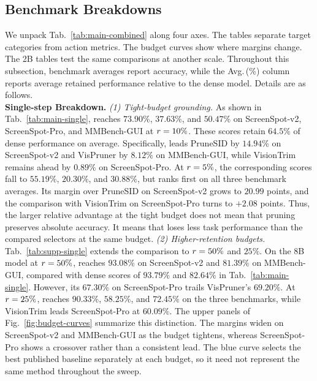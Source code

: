 \subsection{Benchmark Breakdowns}
\label{app:supp-results}
\label{app:full}
We unpack Tab.~\ref{tab:main-combined} along four axes. The tables separate target categories from action metrics. The budget curves show where margins change. The 2B tables test the same comparisons at another scale.
%
Throughout this subsection, benchmark averages report accuracy, while the Avg.\,(\%) column reports average retained performance relative to the dense model.
%
Details are as follows.
\\
\noindent\textbf{Single-step Breakdown.}
\noindent\textit{(1) Tight-budget grounding.}
As shown in Tab.~\ref{tab:main-single}, \method{} reaches $73.90\%$, $37.63\%$, and $50.47\%$ on ScreenSpot-v2, ScreenSpot-Pro, and MMBench-GUI at $r=10\%$.
%
These scores retain $64.5\%$ of dense performance on average.
%
Specifically, \method{} leads PruneSID by $14.94\%$ on ScreenSpot-v2 and VisPruner by $8.12\%$ on MMBench-GUI, while VisionTrim remains ahead by $0.89\%$ on ScreenSpot-Pro.
%
At $r=5\%$, the corresponding scores fall to $55.19\%$, $20.30\%$, and $30.88\%$, but \method{} ranks first on all three benchmark averages.
%
Its margin over PruneSID on ScreenSpot-v2 grows to $20.99$ points, and the comparison with VisionTrim on ScreenSpot-Pro turns to $+2.08$ points.
%
Thus, the larger relative advantage at the tight budget does not mean that pruning preserves absolute accuracy. It means that \method{} loses less task performance than the compared selectors at the same budget.
%
\noindent\textit{(2) Higher-retention budgets.}
Tab.~\ref{tab:supp-single} extends the comparison to $r=50\%$ and $25\%$.
%
On the 8B model at $r=50\%$, \method{} reaches $93.08\%$ on ScreenSpot-v2 and $81.39\%$ on MMBench-GUI, compared with dense scores of $93.79\%$ and $82.64\%$ in Tab.~\ref{tab:main-single}.
%
However, its $67.30\%$ on ScreenSpot-Pro trails VisPruner's $69.20\%$.
%
At $r=25\%$, \method{} reaches $90.33\%$, $58.25\%$, and $72.45\%$ on the three benchmarks, while VisionTrim leads ScreenSpot-Pro at $60.09\%$.
%
The upper panels of Fig.~\ref{fig:budget-curves} summarize this distinction. The margins widen on ScreenSpot-v2 and MMBench-GUI as the budget tightens, whereas ScreenSpot-Pro shows a crossover rather than a consistent lead.
%
The blue curve selects the best published baseline separately at each budget, so it need not represent the same method throughout the sweep.
\\
